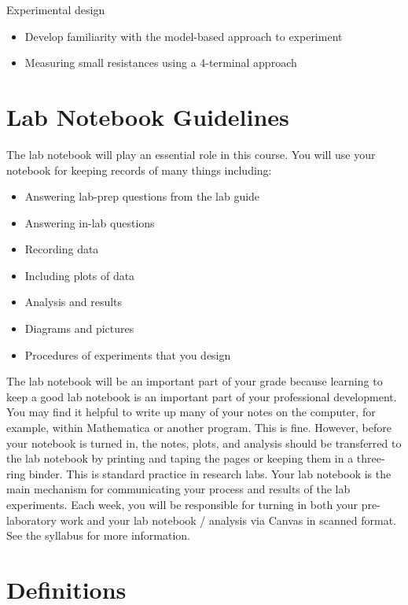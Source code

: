 \documentclass[
]{article}
\begin{document}
Experimental design

\begin{itemize}
\item
  Develop familiarity with the model-based approach to experiment
\item
  Measuring small resistances using a 4-terminal approach
\end{itemize}

\hypertarget{lab-notebook-guidelines}{%
\section{Lab Notebook Guidelines}\label{lab-notebook-guidelines}}

The lab notebook will play an essential role in this course. You will
use your notebook for keeping records of many things including:

\begin{itemize}
\item
  Answering lab-prep questions from the lab guide
\item
  Answering in-lab questions
\item
  Recording data
\item
  Including plots of data
\item
  Analysis and results
\item
  Diagrams and pictures
\item
  Procedures of experiments that you design
\end{itemize}

The lab notebook will be an important part of your grade because
learning to keep a good lab notebook is an important part of your
professional development. You may find it helpful to write up many of
your notes on the computer, for example, within Mathematica or another
program. This is fine. However, before your notebook is turned in, the
notes, plots, and analysis should be transferred to the lab notebook by
printing and taping the pages or keeping them in a three-ring binder.
This is standard practice in research labs. Your lab notebook is the
main mechanism for communicating your process and results of the lab
experiments. Each week, you will be responsible for turning in both your
pre-laboratory work and your lab notebook / analysis via Canvas in
scanned format. See the syllabus for more information.

\hypertarget{definitions}{%
\section{Definitions}\label{definitions}}
\end{document}
